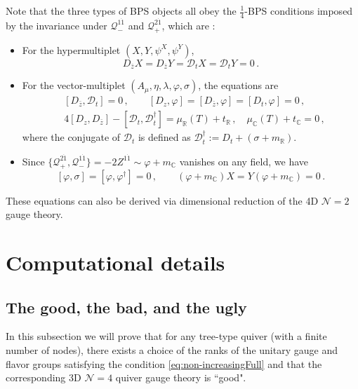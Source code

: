 \documentclass[12pt,a4paper]{article}
\renewcommand{\(}{\left(}
\renewcommand{\)}{\right)}
\renewcommand{\(}{\left(}
\renewcommand{\)}{\right)}
\begin{document}
\medskip 

Note that the three types of BPS objects all obey the $\frac{1}{4}$-BPS conditions imposed by the invariance under $\mathcal{Q}^{1\dot{1}}_{-}$ and $\mathcal{Q}^{2\dot{1}}_{+}$, which are \cite{Bullimore:2016hdc}:
\begin{itemize}
\item For the hypermultiplet $(X,Y,\psi^X,\psi^Y)$,
\begin{equation}\label{eq:14BSPhyper}
D_{\bar{z}}X=D_{\bar{z}}Y=\mathcal{D}_t X=\mathcal{D}_t Y=0\,.
\end{equation}
 
\item For the vector-multiplet $(A_\mu,\eta,\lambda,\varphi,\sigma)$, the equations are
\begin{equation}\label{eq:14BPSvector}
\begin{aligned}
&[D_{\bar{z}},\mathcal{D}_t]=0\,,\quad \quad [D_z,\varphi]=[D_{\bar{z}},\varphi]=[D_t,\varphi]=0\,,\\
&4[D_z, D_{\bar{z}}]-[\mathcal{D}_t,\mathcal{D}^\dag_t]=\mu_{\mathbb{R}}(T)+t_{\mathbb{R}}\,,\quad\mu_{\mathbb{C}}(T)+t_{\mathbb{C}}=0\,,
\end{aligned}
\end{equation}
where the conjugate of $\mathcal{D}_t$ is defined as $\mathcal{D}_t^\dag:=D_t+(\sigma+m_{\mathbb{R}})$. 
\item Since $\{\mathcal{Q}_{+}^{2\dot{1}},\mathcal{Q}_{-}^{1\dot{1}}\}=-2Z^{1\dot{1}}\sim \varphi+m_{\mathbb{C}}$ vanishes on any field, we have
\begin{equation}\label{eq:14BPSremaining}
[\varphi,\sigma]=[\varphi,\varphi^\dag]=0\,,\qquad (\varphi+m_{\mathbb{C}})X=Y(\varphi+m_{\mathbb{C}})=0\,.
\end{equation}
\end{itemize}
These equations can also be derived via dimensional reduction of the 4D $\mathcal{N}=2$ gauge theory. 

\section{Computational details}\label{appsec:details}

\subsection{The good, the bad, and the ugly}
\label{appssec:GoodBadUgly}
In this subsection we will prove that for any tree-type quiver (with a finite number of  nodes), there exists a choice of the ranks of the unitary gauge and flavor groups satisfying the condition \eqref{eq:non-increasingFull} and that the corresponding 3D $\mathcal{N}=4$ quiver gauge theory is ``good".
\end{document}
